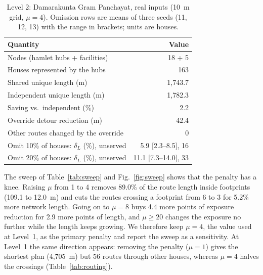 \documentclass[journal]{IEEEtran}
\begin{document}
\begin{table}[t]
\centering
\caption{Level 2: Damarakunta Gram Panchayat, real inputs (10~m grid, $\mu=4$). Omission rows are means of three seeds (11, 12, 13) with the range in brackets; units are houses.}
\label{tab:gp}
\footnotesize
\setlength{\tabcolsep}{3pt}
\begin{tabular}{@{}lr@{}}
\toprule
Quantity & Value\\
\midrule
Nodes (hamlet hubs + facilities) & 18 + 5\\
Houses represented by the hubs & 163\\
Shared unique length (m) & 1{,}743.7\\
Independent unique length (m) & 1{,}782.3\\
Saving vs.\ independent (\%) & 2.2\\
Override detour reduction (m) & 42.4\\
Other routes changed by the override & 0\\
Omit 10\% of houses: $\delta_L$ (\%), unserved & 5.9 [2.3--8.5], 16\\
Omit 20\% of houses: $\delta_L$ (\%), unserved & 11.1 [7.3--14.0], 33\\
\bottomrule
\end{tabular}
\end{table}

The sweep of Table~\ref{tab:sweep} and Fig.~\ref{fig:sweep} shows that the penalty has a knee. Raising $\mu$ from 1 to 4 removes 89.0\% of the route length inside footprints (109.1 to 12.0~m) and cuts the routes crossing a footprint from 6 to 3 for 5.2\% more network length. Going on to $\mu=8$ buys 4.4 more points of exposure reduction for 2.9 more points of length, and $\mu\ge 20$ changes the exposure no further while the length keeps growing. We therefore keep $\mu=4$, the value used at Level~1, as the primary penalty and report the sweep as a sensitivity. At Level~1 the same direction appears: removing the penalty ($\mu=1$) gives the shortest plan (4{,}705~m) but 56 routes through other houses, whereas $\mu=4$ halves the crossings (Table~\ref{tab:routing}).
\end{document}
